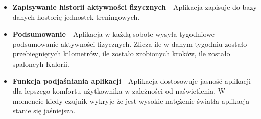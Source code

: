 \begin{itemize}
    \item \textbf{Zapisywanie historii aktywności fizycznych} - Aplikacja zapisuje do bazy danych hostorię jednostek treningowych.
    \item \textbf{Podsumowanie} - Aplikacja w każdą sobote wysyła tygodniowe podsumowanie aktywności fizycznych. Zlicza ile w danym tygodniu zostało przebiegniętych kilometrów, ile zostało zrobionych kroków, ile zostało spaloncyh Kalorii.
    \item \textbf{Funkcja podjaśniania aplikacji} - Aplikacja dostosowuje jasność aplikacji dla lepszego komfortu użytkownika w zależności od naświetlenia. W momencie kiedy czujnik wykryje że jest wysokie natężenie światła aplikacja stanie się jaśniejsza.
\end{itemize}


